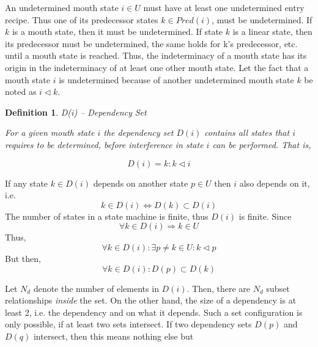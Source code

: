\documentclass[12pt,a4paper]{scrartcl}
\theoremstyle{break}
\newtheorem{definition}{Definition}
\begin{document}
An undetermined mouth state $i \in U$ must have at least one undetermined entry
recipe. Thus one of its predecessor states $k \in Pred(i)$, must be undetermined.
If $k$ is a mouth state, then it must be undetermined.  If state $k$ is a
linear state, then its predecessor must be undetermined, the same holds for k's
predecessor, etc. until a mouth state is reached. Thus, the indeterminacy of a
mouth state has its origin in the indeterminacy of at least one other mouth
state.  Let the fact that a mouth state $i$ is undetermined because of another
undetermined mouth state $k$ be noted as $i \vartriangleleft k$. 

\begin{definition}
D(i) -- Dependency Set 

For a given mouth state $i$ the dependency set $D(i)$ contains all states
that $i$ requires to be determined, before interference in state $i$ can be
performed. That is,

\begin{equation}
        D(i) = { k: k \vartriangleleft i }
\end{equation}

\end{definition}

If any state $k \in D(i)$ depends on another state $p \in U$ then $i$ also depends
on it, i.e.
\begin{equation}
         k \in D(i) \Leftrightarrow D(k) \subset D(i)     
\end{equation}
The number of states in a state machine is finite, thus $D(i)$ is finite. Since
\begin{equation}
         \forall k \in D(i) \Rightarrow k \in U
\end{equation}
Thus,
\begin{equation}
         \forall k \in D(i): \exists p \neq k \in U : k \vartriangleleft p
\end{equation}
But then,
\begin{equation}
         \forall k \in D(i): D(p) \subset D(k)
\end{equation}

Let $N_d$ denote the number of elements in $D(i)$. Then, there are $N_d$ subset
relationships {\it inside} the set. On the other hand, the size of a dependency
is at least 2, i.e. the dependency and on what it depends. Such a set
configuration is only possible, if at least two sets intersect. If two
dependency sets $D(p)$ and $D(q)$ intersect, then this means nothing else but
\end{document}
